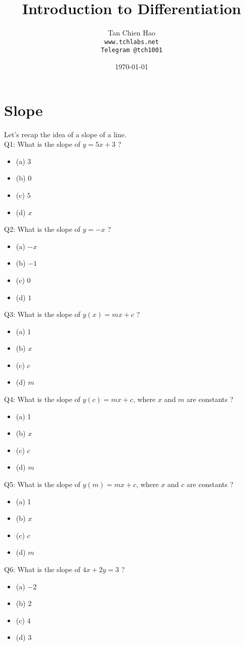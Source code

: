 \documentclass{article}
\title{Introduction to Differentiation}
\author{
    Tan Chien Hao\\
    \texttt{www.tchlabs.net}\\
    \texttt{Telegram @tch1001}
}
\date{\today}
\begin{document}
\newif\ifpaper

\paperfalse 

\maketitle
\section{Slope}
Let's recap the idea of a slope of a line.\\[10pt]
Q1: What is the slope of $y=5 x+3$ ?
\begin{itemize}
\item[](a) $3$
\item[](b) $0$
\item[](c) $5$
\item[](d) $x$
\end{itemize}
Q2: What is the slope of $y=-x$ ?
\begin{itemize}
\item[](a) $-x$
\item[](b) $-1$
\item[](c) $0$
\item[](d) $1$
\end{itemize}
Q3: What is the slope of $y(x)=m x+c$ ?
\begin{itemize}
\item[](a) $1$
\item[](b) $x$
\item[](c) $c$
\item[](d) $m$
\end{itemize}
Q4: What is the slope of $y(c)=m x+c$, where $x$ and $m$ are constants ?
\begin{itemize}
\item[](a) 1
\item[](b) $x$
\item[](c) $c$
\item[](d) $m$
\end{itemize}
Q5: What is the slope of $y(m)=m x+c$, where $x$ and $c$ are constants ?
\begin{itemize}
\item[](a) 1
\item[](b) $x$
\item[](c) $c$
\item[](d) $m$
\end{itemize}
Q6: What is the slope of $4 x+2 y=3$ ?
\begin{itemize}
\item[](a) $-2$
\item[](b) $ 2$
\item[](c) $ 4$
\item[](d) $ 3$
\end{itemize}
\end{document}
